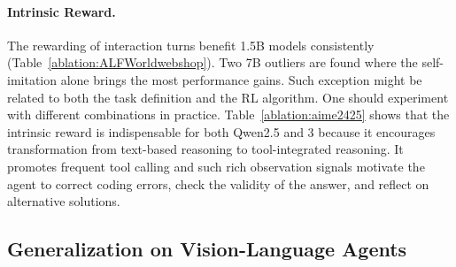 \documentclass[]{youtu} %
\begin{document}
\paragraph{Intrinsic Reward.}
The rewarding of interaction turns benefit 1.5B models consistently (Table~\ref{ablation:ALFWorldwebshop}).
Two 7B outliers are found where the self-imitation alone brings the most performance gains.
Such exception might be related to both the task definition and the RL algorithm.
One should experiment with different combinations in practice.
Table~\ref{ablation:aime2425} shows that the intrinsic reward is indispensable for both Qwen2.5 and 3 because it encourages transformation from text-based reasoning to tool-integrated reasoning.
It promotes frequent tool calling and such rich observation signals motivate the agent to correct coding errors,
check the validity of the answer,
and reflect on alternative solutions.







\subsection{Generalization on Vision-Language Agents}
\label{sec:generalvlagent}
\end{document}
